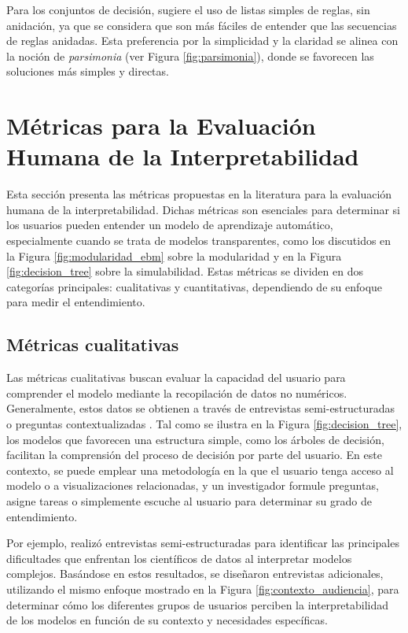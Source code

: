 Para los conjuntos de decisión, \cite{lakkaraju-2016} sugiere el uso de listas simples de reglas, sin anidación, ya que se considera que son más fáciles de entender que las secuencias de reglas anidadas. Esta preferencia por la simplicidad y la claridad se alinea con la noción de \textit{parsimonia} (ver Figura \ref{fig:parsimonia}), donde se favorecen las soluciones más simples y directas.

\section{Métricas para la Evaluación Humana de la Interpretabilidad}

Esta sección presenta las métricas propuestas en la literatura para la evaluación humana de la interpretabilidad. Dichas métricas son esenciales para determinar si los usuarios pueden entender un modelo de aprendizaje automático, especialmente cuando se trata de modelos transparentes, como los discutidos en la Figura \ref{fig:modularidad_ebm} sobre la modularidad y en la Figura \ref{fig:decision_tree} sobre la simulabilidad. Estas métricas se dividen en dos categorías principales: cualitativas y cuantitativas, dependiendo de su enfoque para medir el entendimiento.

\subsection{Métricas cualitativas}

Las métricas cualitativas buscan evaluar la capacidad del usuario para comprender el modelo mediante la recopilación de datos no numéricos. Generalmente, estos datos se obtienen a través de entrevistas semi-estructuradas o preguntas contextualizadas \cite{Kaur-2020}. Tal como se ilustra en la Figura \ref{fig:decision_tree}, los modelos que favorecen una estructura simple, como los árboles de decisión, facilitan la comprensión del proceso de decisión por parte del usuario. En este contexto, se puede emplear una metodología en la que el usuario tenga acceso al modelo o a visualizaciones relacionadas, y un investigador formule preguntas, asigne tareas o simplemente escuche al usuario para determinar su grado de entendimiento.

Por ejemplo, \cite{Kaur-2020} realizó entrevistas semi-estructuradas para identificar las principales dificultades que enfrentan los científicos de datos al interpretar modelos complejos. Basándose en estos resultados, se diseñaron entrevistas adicionales, utilizando el mismo enfoque mostrado en la Figura \ref{fig:contexto_audiencia}, para determinar cómo los diferentes grupos de usuarios perciben la interpretabilidad de los modelos en función de su contexto y necesidades específicas.

